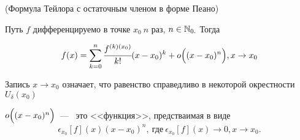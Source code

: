 \begin{theorem}
	\hypertarget{thrm5.14}{(Формула Тейлора с остаточным членом в форме Пеано)} Путь $f$ дифференцируемо в точке $x_{0} \ n$ раз, $n \in \mathbb{N}_{0.}$ Тогда 
	
	$$f(x) = \sum\limits_{k = 0}^n \cfrac{f^{(k)(x_{0})}}{k!}(x-x_{0})^{k} + o\Bigl( (x-x_{0})^{n} \Bigr), x \to x_{0}$$
\begin{note}
	Запись $x\to x_{0}$ означает, что равенство справедливо в некоторой окрестности $U_{\delta}(x_{0})$
	
	$o\Bigl( (x-x_{0})^{n} \Bigr)$~---~ это <<функция>>, предстваимая в виде $$\epsilon_{x_{0}}[f](x)(x-x_{0})^{n}, \ \textrm{где} \ \epsilon_{x_{0}}[f](x) \to 0, x\to x_{0}.$$
\end{note}	

\end{theorem}
